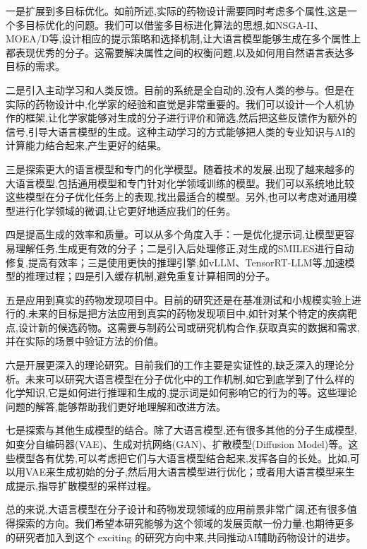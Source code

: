 一是扩展到多目标优化。如前所述,实际的药物设计需要同时考虑多个属性,这是一个多目标优化的问题。我们可以借鉴多目标进化算法的思想,如NSGA-II、MOEA/D等,设计相应的提示策略和选择机制,让大语言模型能够生成在多个属性上都表现优秀的分子。这需要解决属性之间的权衡问题,以及如何用自然语言表达多目标的需求。

二是引入主动学习和人类反馈。目前的系统是全自动的,没有人类的参与。但是在实际的药物设计中,化学家的经验和直觉是非常重要的。我们可以设计一个人机协作的框架,让化学家能够对生成的分子进行评价和筛选,然后把这些反馈作为额外的信号,引导大语言模型的生成。这种主动学习的方式能够把人类的专业知识与AI的计算能力结合起来,产生更好的结果。

三是探索更大的语言模型和专门的化学模型。随着技术的发展,出现了越来越多的大语言模型,包括通用模型和专门针对化学领域训练的模型。我们可以系统地比较这些模型在分子优化任务上的表现,找出最适合的模型。另外,也可以考虑对通用模型进行化学领域的微调,让它更好地适应我们的任务。

四是提高生成的效率和质量。可以从多个角度入手：一是优化提示词,让模型更容易理解任务,生成更有效的分子；二是引入后处理修正,对生成的SMILES进行自动修复,提高有效率；三是使用更快的推理引擎,如vLLM、TensorRT-LLM等,加速模型的推理过程；四是引入缓存机制,避免重复计算相同的分子。

五是应用到真实的药物发现项目中。目前的研究还是在基准测试和小规模实验上进行的,未来的目标是把方法应用到真实的药物发现项目中,如针对某个特定的疾病靶点,设计新的候选药物。这需要与制药公司或研究机构合作,获取真实的数据和需求,并在实际的场景中验证方法的价值。

六是开展更深入的理论研究。目前我们的工作主要是实证性的,缺乏深入的理论分析。未来可以研究大语言模型在分子优化中的工作机制,如它到底学到了什么样的化学知识,它是如何进行推理和生成的,提示词是如何影响它的行为的等。这些理论问题的解答,能够帮助我们更好地理解和改进方法。

七是探索与其他生成模型的结合。除了大语言模型,还有很多其他的分子生成模型,如变分自编码器(VAE)、生成对抗网络(GAN)、扩散模型(Diffusion Model)等。这些模型各有优势,可以考虑把它们与大语言模型结合起来,发挥各自的长处。比如,可以用VAE来生成初始的分子,然后用大语言模型进行优化；或者用大语言模型来生成提示,指导扩散模型的采样过程。

总的来说,大语言模型在分子设计和药物发现领域的应用前景非常广阔,还有很多值得探索的方向。我们希望本研究能够为这个领域的发展贡献一份力量,也期待更多的研究者加入到这个 exciting 的研究方向中来,共同推动AI辅助药物设计的进步。

\newpage

